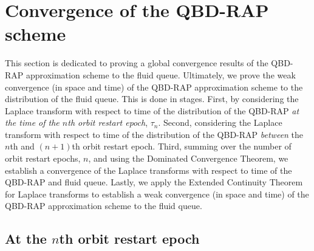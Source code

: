 \section{Convergence of the QBD-RAP scheme}\label{sec: local to global}
This section is dedicated to proving a global convergence results of the QBD-RAP approximation scheme to the fluid queue. Ultimately, we prove the weak convergence (in space and time) of the QBD-RAP approximation scheme to the distribution of the fluid queue. This is done in stages. First, by considering the Laplace transform with respect to time of the distribution of the QBD-RAP \emph{at the time of the \(n\)th orbit restart epoch}, \(\tau_n\). Second, considering the Laplace transform with respect to time of the distribution of the QBD-RAP \emph{between} the \(n\)th and \((n+1)\)th orbit restart epoch. Third, summing over the number of orbit restart epochs, \(n\), and using the Dominated Convergence Theorem, we establish a convergence of the Laplace transforms with respect to time of the QBD-RAP and fluid queue. Lastly, we apply the Extended Continuity Theorem for Laplace transforms \cite[Chapter XIII, Theorem 2a]{feller1957} to establish a weak convergence (in space and time) of the QBD-RAP approximation scheme to the fluid queue.

\subsection{At the \(n\)th orbit restart epoch}\label{sec: nth change}


